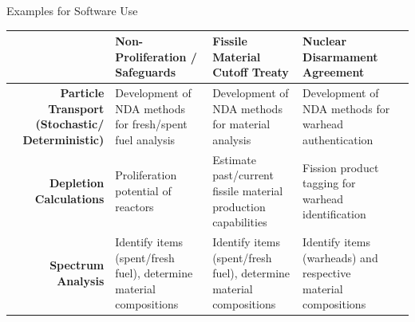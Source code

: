 \documentclass[presentation]{beamer}
\begin{document}
\begin{frame}[label=sec-7-6]{Examples for Software Use}

\begin{table}[htb]
\fontsize{7pt}{8.4}\selectfont
\begin{center}
\begin{tabularx}{\textwidth}{>{\bf}RLLLL}
\toprule
  & \bf Non-Proliferation / Safeguards  & \bf Fissile Material Cutoff Treaty  & \bf Nuclear Disarmament Agreement  \\
\toprule
 Particle Transport (Stochastic/ Deterministic) & Development of NDA methods for fresh/spent fuel analysis & Development of NDA methods for material analysis   & Development of NDA methods for warhead authentication \\
\midrule
 Depletion Calculations & Proliferation potential of reactors  & Estimate past/current fissile material production capabilities & Fission product tagging for warhead identification \\
\midrule
 Spectrum Analysis & Identify items (spent/fresh fuel), determine material compositions & Identify items (spent/fresh fuel), determine material compositions & Identify items (warheads) and respective material compositions \\

\end{tabularx}
\end{center}
\end{table}
\end{frame}
\end{document}
